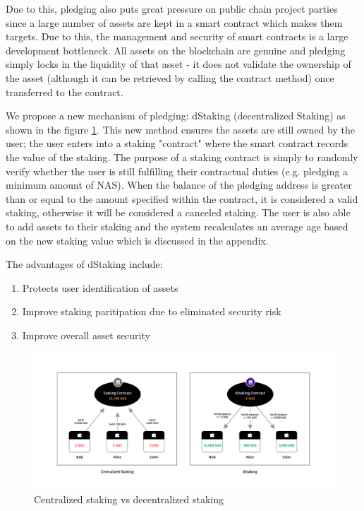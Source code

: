 Due to this, pledging also puts great pressure on public chain project parties since a large number of assets are kept in a smart contract which makes them targets. Due to this, the management and security of smart contracts is a large development bottleneck. All assets on the blockchain are genuine and pledging simply locks in the liquidity of that asset - it does not validate the ownership of the asset (although it can be retrieved by calling the contract method) once transferred to the contract.

We propose a new mechanism of pledging: dStaking (decentralized Staking) as shown in the figure \ref{fig:dStaking}. This new method ensures the assets are still owned by the user; the user enters into a staking "contract" where the smart contract records the value of the staking. The purpose of a staking contract is simply to randomly verify whether the user is still fulfilling their contractual duties (e.g. pledging a minimum amount of NAS). When the balance of the pledging address is greater than or equal to the amount specified within the contract, it is considered a valid staking, otherwise it will be considered a canceled staking. The user is also able to add assets to their staking and the system recalculates an average age based on the new staking value which is discussed in the appendix.

The advantages of dStaking include:
\begin{enumerate}[\hspace{2cm}(a)]
    \item Protects user identification of assets
    \item Improve staking paritipation due to eliminated security risk
    \item Improve overall asset security
\end{enumerate}

\begin{figure}[htbp]
  \centering
  \includegraphics[width=1\textwidth]{../common/dStaking.pdf}
  \caption{Centralized staking vs decentralized staking\label{fig:dStaking}}
\end{figure}

